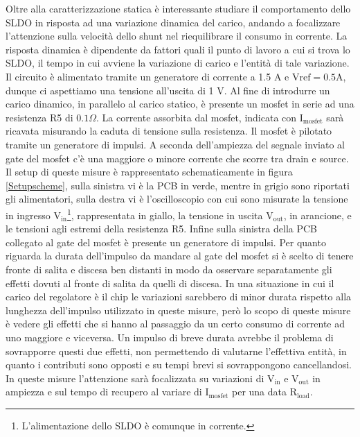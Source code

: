 Oltre alla caratterizzazione statica è interessante studiare il comportamento dello SLDO in risposta ad una variazione dinamica del carico, andando a focalizzare l'attenzione sulla velocità dello shunt nel riequilibrare il consumo in corrente. La risposta dinamica è dipendente da fattori quali il punto di lavoro a cui si trova lo SLDO, il tempo in cui avviene la variazione di carico e l'entità di tale variazione. 
Il circuito è alimentato tramite un generatore di corrente a 1.5 A e $\mathrm{Vref=0.5 A}$, dunque ci aspettiamo una tensione all'uscita di 1 V. Al fine di introdurre un carico dinamico, in parallelo al carico statico, è presente un mosfet in serie ad una resistenza R5 di $0.1 \Omega$. 
La corrente assorbita dal mosfet, indicata con $\mathrm{I_{mosfet}}$ sarà ricavata misurando la caduta di tensione sulla resistenza. 
Il mosfet è pilotato tramite un generatore di impulsi. A seconda dell'ampiezza del segnale inviato al gate del mosfet c'è una maggiore o minore corrente che scorre tra drain e source. 
Il setup di queste misure è rappresentato schematicamente in figura \ref{Setupscheme}, sulla sinistra vi è la PCB in verde, mentre in grigio sono riportati gli alimentatori, sulla destra vi è l'oscilloscopio con cui sono misurate la tensione in ingresso $\mathrm{V_{in}}$\footnote{L'alimentazione dello SLDO è comunque in corrente.}, rappresentata in giallo, la tensione in uscita $\mathrm{V_{out}}$, in arancione, e le tensioni agli estremi della resistenza R5. Infine sulla sinistra della PCB collegato al gate del mosfet è presente un generatore di impulsi. 
Per quanto riguarda la durata dell'impulso da mandare al gate del mosfet si è scelto di tenere fronte di salita e discesa ben distanti in modo da osservare separatamente gli effetti dovuti al fronte di salita da quelli di discesa. 
In una situazione in cui il carico del regolatore è il chip le variazioni sarebbero di minor durata rispetto alla lunghezza dell'impulso utilizzato in queste misure, però lo scopo di queste misure è vedere gli effetti che si hanno al passaggio da un certo consumo di corrente ad uno maggiore e viceversa. 
Un impulso di breve durata avrebbe il problema di sovrapporre questi due effetti, non permettendo di valutarne l'effettiva entità, in quanto i contributi sono opposti e su tempi brevi si sovrappongono cancellandosi.
In queste misure l'attenzione sarà focalizzata su variazioni di $\mathrm{V_{in}}$ e $\mathrm{V_{out}}$ in ampiezza e sul tempo di recupero al variare di $\mathrm{I_{mosfet}}$ per una data $\mathrm{R_{load}}$.

